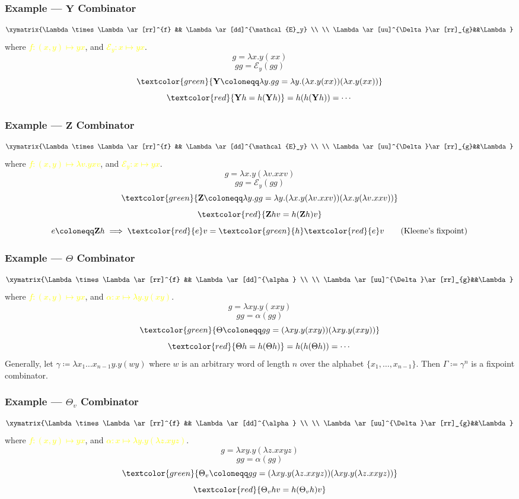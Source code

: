\documentclass[UTF8,aspectratio=43,11pt,colorlinks,compress,openany]{beamer}%
\begin{document}
\begin{frame}\frametitle{Example --- $\mathbf{Y}$ Combinator}
	\[\xymatrix{\Lambda\times \Lambda
		\ar[rr]^{f} && \Lambda \ar[dd]^{\mathcal{E}_y}
		\\
		\\
		\Lambda\ar[uu]^{\Delta}\ar[rr]_{g}&&\Lambda}\]
	where \textcolor{yellow}{$f:(x,y)\mapsto yx$}, and \textcolor{yellow}{$\mathcal{E}_y: x\mapsto yx$}.
	\[g=\lambda x.y(xx)\]
	\[gg=\mathcal{E}_y(gg)\]
	\[\textcolor{green}{\mathbf{Y}\coloneqq \lambda y.gg=\lambda y.(\lambda x.y(xx))(\lambda x.y(xx))}\]
	\[\textcolor{red}{\mathbf{Y}h=h(\mathbf{Y}h)}=h(h(\mathbf{Y}h))=\cdots\]
\end{frame}

\begin{frame}\frametitle{Example --- $\mathbf{Z}$ Combinator}
	\[\xymatrix{\Lambda\times \Lambda
		\ar[rr]^{f} && \Lambda \ar[dd]^{\mathcal{E}_y}
		\\
		\\
		\Lambda\ar[uu]^{\Delta}\ar[rr]_{g}&&\Lambda}\]
	where \textcolor{yellow}{$f:(x,y)\mapsto \lambda v.yxv$}, and \textcolor{yellow}{$\mathcal{E}_y: x\mapsto yx$}.
	\[g=\lambda x.y(\lambda v.xxv)\]
	\[gg=\mathcal{E}_y(gg)\]
	\[\textcolor{green}{\mathbf{Z}\coloneqq \lambda y.gg=\lambda y.(\lambda x.y(\lambda v.xxv))(\lambda x.y(\lambda v.xxv))}\]
	\[\textcolor{red}{\mathbf{Z}h v=h(\mathbf{Z}h)v}\]
	\[e\coloneqq \mathbf{Z}h\implies \textcolor{red}{e}v=\textcolor{green}{h}\textcolor{red}{e}v\tag{Kleene's fixpoint}\]
\end{frame}

\begin{frame}\frametitle{Example --- $\Theta$ Combinator}
	\[\xymatrix{\Lambda\times \Lambda
		\ar[rr]^{f} && \Lambda \ar[dd]^{\alpha}
		\\
		\\
		\Lambda\ar[uu]^{\Delta}\ar[rr]_{g}&&\Lambda}\]
	where \textcolor{yellow}{$f:(x,y)\mapsto yx$}, and \textcolor{yellow}{$\alpha: x\mapsto\lambda y.y(xy)$}.
	\[g=\lambda xy.y(xxy)\]
	\[gg=\alpha(gg)\]
	\[\textcolor{green}{\Theta\coloneqq gg=(\lambda xy.y(xxy))(\lambda xy.y(xxy))}\]
	\[\textcolor{red}{\Theta h=h(\Theta h)}=h(h(\Theta h))=\cdots\]
Generally, let $\gamma\coloneqq \lambda x_1\dots x_{n-1}y.y(wy)$ where $w$ is an arbitrary word of length $n$ over the alphabet $\{x_1,\dots, x_{n-1}\}$. Then $\Gamma\coloneqq \gamma^n$ is a fixpoint combinator.
\end{frame}

\begin{frame}\frametitle{Example --- $\Theta_v$ Combinator}
	\[\xymatrix{\Lambda\times \Lambda
		\ar[rr]^{f} && \Lambda \ar[dd]^{\alpha}
		\\
		\\
		\Lambda\ar[uu]^{\Delta}\ar[rr]_{g}&&\Lambda}\]
	where \textcolor{yellow}{$f:(x,y)\mapsto yx$}, and \textcolor{yellow}{$\alpha: x\mapsto\lambda y.y(\lambda z.xyz)$}.
	\[g=\lambda xy.y(\lambda z.xxyz)\]
	\[gg=\alpha(gg)\]
	\[\textcolor{green}{\Theta_v\coloneqq gg=(\lambda xy.y(\lambda z.xxyz))(\lambda xy.y(\lambda z.xxyz))}\]
	\[\textcolor{red}{\Theta_vhv=h(\Theta_vh)v}\]
\end{frame}
\end{document}
